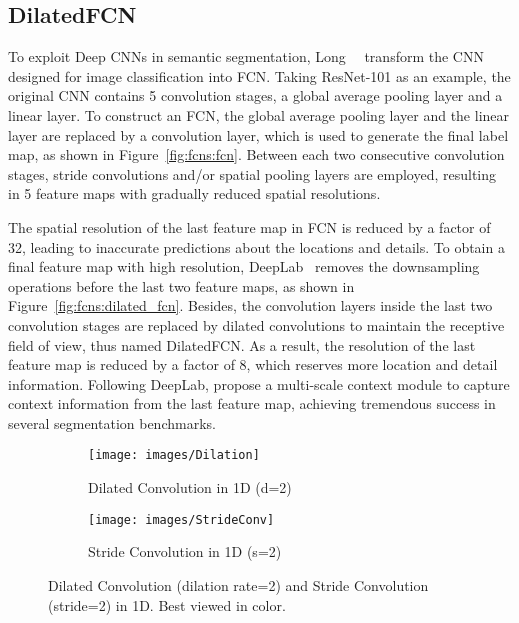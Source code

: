 \documentclass[10pt,twocolumn,letterpaper]{article}
\begin{document}
\subsection{DilatedFCN}
To exploit Deep CNNs in semantic segmentation, Long~\etal~\cite{long2015fully} transform the CNN designed for image classification into FCN.
Taking ResNet-101 as an example, the original CNN contains 5 convolution stages, a global average pooling layer and a linear layer.
To construct an FCN, the global average pooling layer and the linear layer are replaced by a convolution layer, which is used to generate the final label map, as shown in Figure~\ref{fig:fcns:fcn}.
Between each two consecutive convolution stages, stride convolutions and/or spatial pooling layers are employed, resulting in 5 feature maps with gradually reduced spatial resolutions.

The spatial resolution of the last feature map in FCN is reduced by a factor of 32, leading to inaccurate predictions about the locations and details.
To obtain a final feature map with high resolution, DeepLab~\cite{chen2018deeplab} removes the downsampling operations before the last two feature maps, as shown in Figure~\ref{fig:fcns:dilated_fcn}.
Besides, the convolution layers inside the last two convolution stages are replaced by dilated convolutions to maintain the receptive field of view, thus named DilatedFCN.
As a result, the resolution of the last feature map is reduced by a factor of 8, which reserves more location and detail information.
Following DeepLab, \cite{zhao2017pyramid,chen2017rethinking} propose a multi-scale context module to capture context information from the last feature map, achieving tremendous success in several segmentation benchmarks.
\begin{figure*} 
\begin{center}
	\begin{subfigure}[b]{0.608\linewidth}
		\texttt{[image: images/Dilation]}
      	\caption{Dilated Convolution in 1D (d=2)}
      	\label{fig:dilation:dilated_conv}
    \end{subfigure}
    \hfill
    \begin{subfigure}[b]{0.372\linewidth}
		\texttt{[image: images/StrideConv]}
      	\caption{Stride Convolution in 1D (s=2)}
      	\label{fig:dilation:stride_conv}
    \end{subfigure}
\end{center}
	\caption{Dilated Convolution (dilation rate=2) and Stride Convolution (stride=2) in 1D. Best viewed in color.}
	\label{fig:dilation}
\end{figure*}
\end{document}
